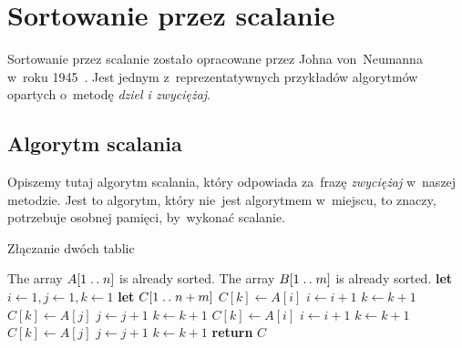 \section{Sortowanie przez scalanie}

Sortowanie przez scalanie zostało opracowane
przez Johna von~Neumanna w~roku 1945~\cite{merge-sort-wiki}.
Jest jednym z~reprezentatywnych przykładów
algorytmów opartych o~metodę \emph{dziel i zwyciężaj}.

\subsection{Algorytm scalania}
Opiszemy tutaj algorytm scalania, który odpowiada 
za~frazę \emph{zwyciężaj} w~naszej metodzie.
Jest to algorytm, który nie~jest algorytmem w~miejscu,
to znaczy, potrzebuje osobnej pamięci, by~wykonać
scalanie.

\begin{algorithm}
    \label{alg:merge}
    \caption{Złączanie dwóch tablic}
    \begin{algorithmic}[1]
        \Require The array \( A[1 \mathrel{{.}\,{.}}\nobreak n] \) is already sorted.
        \Ensure The array \( B[1 \mathrel{{.}\,{.}}\nobreak m] \) is already sorted.
            \State \textbf{let} \( i \gets 1, j \gets 1, k \gets 1 \)
            \State \textbf{let} \( C[1 \mathrel{{.}\,{.}}\nobreak n + m] \) 
                    \State \( C[k] \gets A[i] \)
                    \State \( i \gets i + 1 \)
                    \State \( k \gets k + 1 \)
                \Else 
                    \State \( C[k] \gets A[j] \)
                    \State \( j \gets j + 1 \)
                    \State \( k \gets k + 1 \)
                \EndIf
            \EndWhile
                \State \( C[k] \gets A[i] \)
                \State \( i \gets i + 1 \)
                \State \( k \gets k + 1 \)
            \EndWhile
                \State \( C[k] \gets A[j] \)
                \State \( j \gets j + 1 \)
                \State \( k \gets k + 1 \)
            \EndWhile
            \State \textbf{return} \( C \)
        \EndProcedure%
    \end{algorithmic}
\end{algorithm}